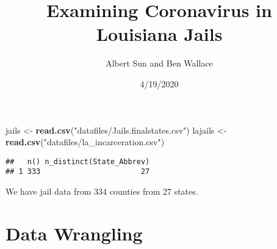 \documentclass[
]{article}
\title{Examining Coronavirus in Louisiana Jails}
\author{Albert Sun and Ben Wallace}
\date{4/19/2020}
\newenvironment{Shaded}{\begin{snugshade}}{\end{snugshade}}
\newcommand{\DataTypeTok}[1]{\textcolor[rgb]{0.13,0.29,0.53}{#1}}
\newcommand{\DecValTok}[1]{\textcolor[rgb]{0.00,0.00,0.81}{#1}}
\newcommand{\KeywordTok}[1]{\textcolor[rgb]{0.13,0.29,0.53}{\textbf{#1}}}
\newcommand{\NormalTok}[1]{#1}
\newcommand{\OperatorTok}[1]{\textcolor[rgb]{0.81,0.36,0.00}{\textbf{#1}}}
\newcommand{\StringTok}[1]{\textcolor[rgb]{0.31,0.60,0.02}{#1}}
\begin{document}
\maketitle

\begin{Shaded}
\begin{Highlighting}[]
\NormalTok{jails <-}\StringTok{ }\KeywordTok{read.csv}\NormalTok{(}\StringTok{"datafiles/Jails.finalstates.csv"}\NormalTok{)}
\NormalTok{lajails <-}\StringTok{ }\KeywordTok{read.csv}\NormalTok{(}\StringTok{"datafiles/la_incarceration.csv"}\NormalTok{)}
\end{Highlighting}
\end{Shaded}

\begin{Shaded}
\end{Shaded}

\begin{verbatim}
##   n() n_distinct(State_Abbrev)
## 1 333                       27
\end{verbatim}

We have jail data from 334 counties from 27 states.

\hypertarget{data-wrangling}{%
\section{Data Wrangling}\label{data-wrangling}}

\begin{Shaded}
\end{Shaded}

\begin{Shaded}
\end{Shaded}
\end{document}
